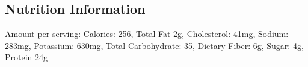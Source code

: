\subsection{Nutrition Information}
Amount per serving: Calories: 256, Total Fat 2g, Cholesterol: 41mg, Sodium: 283mg, Potassium: 630mg, Total Carbohydrate: 35, Dietary Fiber: 6g, Sugar: 4g, Protein 24g

